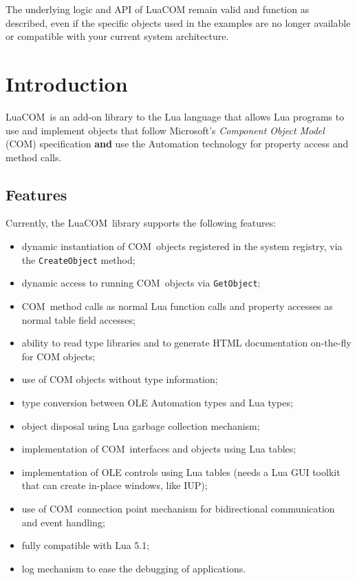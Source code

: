 \documentclass[11pt,a4paper,english]{report}
\newcommand{\techname}[1]{\mbox{#1}}
\newcommand{\com}{\techname{COM}}
\newcommand{\luacom}{\techname{LuaCOM}}
\begin{document}
The underlying logic and API of LuaCOM remain valid and function as
described, even if the specific objects used in the examples are no
longer available or compatible with your current system architecture.

\tableofcontents

\chapter{Introduction}
  \luacom\ is an add-on library to the Lua language that allows Lua
  programs to use and implement objects that follow Microsoft's
  \emph{Component Object Model} (\com) specification {\bf and} use the
  Automation technology for property access
  and method calls.

\section{Features}

  Currently, the \luacom\ library supports the following features:

  \begin{itemize}

    \item dynamic instantiation of \com\ objects registered in the
    system registry, via the \verb+CreateObject+ method;

    \item dynamic access to running \com\ objects via
    \verb+GetObject+;

    \item \com\ method calls as normal Lua function calls and property
    accesses as normal table field accesses;

    \item ability to read type libraries and to generate HTML
    documentation on-the-fly for COM objects;

    \item use of COM objects without type information;

    \item type conversion between OLE Automation types and Lua types;

    \item object disposal using Lua garbage collection mechanism;

    \item implementation of \com\ interfaces and objects using Lua
    tables;

    \item implementation of OLE controls using Lua tables (needs a Lua
    GUI toolkit that can create in-place windows, like IUP);

    \item use of \com\ connection point mechanism for bidirectional
    communication and event handling;

    \item fully compatible with Lua 5.1;

    \item log mechanism to ease the debugging of applications.

  \end{itemize}
\end{document}
